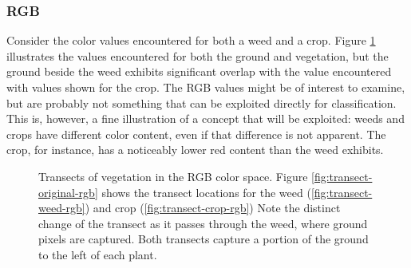\documentclass[letterpaper, notitlepage]{report}
\begin{document}
\subsubsection{RGB}
Consider the color values encountered for both a weed and a crop. Figure \ref{fig:transects-rgb} illustrates the values encountered for both the ground and vegetation, but the ground beside the weed exhibits significant overlap with the value encountered with values shown for the crop.  The RGB values might be of interest to examine, but are probably not something that can be exploited directly for classification. This is, however, a fine illustration of a concept that will be exploited: weeds and crops have different color content, even if that difference is not apparent.  The crop, for instance, has a noticeably lower red content than the weed exhibits.

\begin{figure}[h]
	\centering
	\hfill
	\hfill
	\caption[RGB Transects]{Transects of vegetation in the RGB color space. Figure \ref{fig:transect-original-rgb} shows the transect locations for the weed (\ref{fig:transect-weed-rgb}) and crop (\ref{fig:transect-crop-rgb}) Note the distinct change of the transect as it passes through the weed, where ground pixels are captured. Both transects capture a portion of the ground to the left of each plant.}
	\label{fig:transects-rgb}
\end{figure}
	
\end{document}
